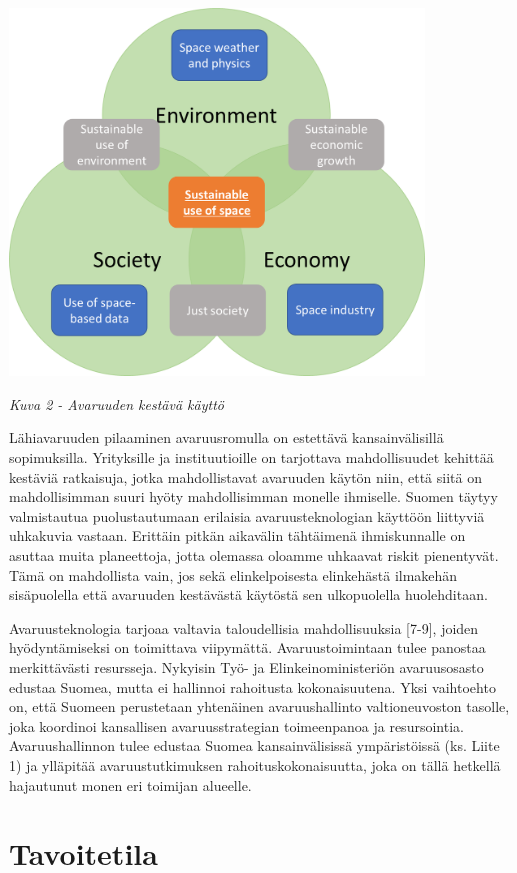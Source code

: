 \documentclass[nobib,finnish,oneside,openany,notoc,a4paper]{tufte-book}
\begin{document}
\includegraphics[width=11cm]{image2.png}

\emph{Kuva 2 - Avaruuden kestävä käyttö}

Lähiavaruuden pilaaminen avaruusromulla on estettävä kansainvälisillä
sopimuksilla. Yrityksille ja instituutioille on tarjottava
mahdollisuudet kehittää kestäviä ratkaisuja, jotka mahdollistavat
avaruuden käytön niin, että siitä on mahdollisimman suuri hyöty
mahdollisimman monelle ihmiselle. Suomen täytyy valmistautua
puolustautumaan erilaisia avaruusteknologian käyttöön liittyviä
uhkakuvia vastaan. Erittäin pitkän aikavälin tähtäimenä ihmiskunnalle on
asuttaa muita planeettoja, jotta olemassa oloamme uhkaavat riskit
pienentyvät. Tämä on mahdollista vain, jos sekä elinkelpoisesta
elinkehästä ilmakehän sisäpuolella että avaruuden kestävästä käytöstä
sen ulkopuolella huolehditaan.

Avaruusteknologia tarjoaa valtavia taloudellisia mahdollisuuksia
{[}7-9{]}, joiden hyödyntämiseksi on toimittava viipymättä.
Avaruustoimintaan tulee panostaa merkittävästi resursseja. Nykyisin Työ-
ja Elinkeinoministeriön avaruusosasto edustaa Suomea, mutta ei hallinnoi
rahoitusta kokonaisuutena. Yksi vaihtoehto on, että Suomeen perustetaan
yhtenäinen avaruushallinto valtioneuvoston tasolle, joka koordinoi
kansallisen avaruusstrategian toimeenpanoa ja resursointia.
Avaruushallinnon tulee edustaa Suomea kansainvälisissä ympäristöissä
(ks. Liite 1) ja ylläpitää avaruustutkimuksen rahoituskokonaisuutta,
joka on tällä hetkellä hajautunut monen eri toimijan alueelle.

\chapter{Tavoitetila}
\end{document}
